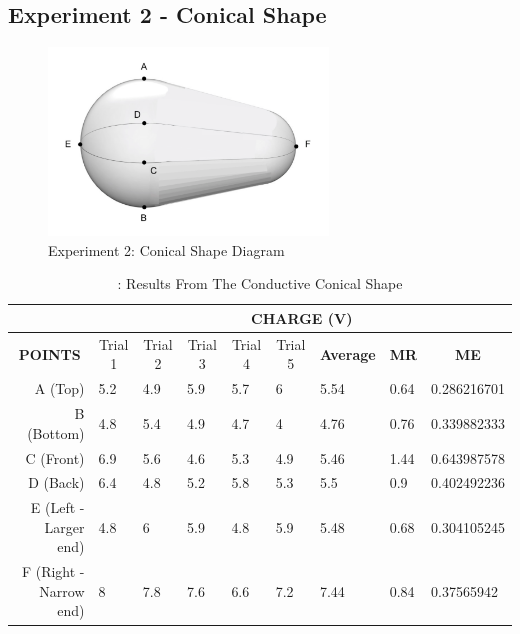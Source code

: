 \newpage

\subsection{Experiment 2 - Conical Shape}

\begin{figure}[h]
    \centering
    \includegraphics[height=5cm]{photos/experiment2image.png} %
    \caption{Experiment 2: Conical Shape Diagram}
    \label{fig:experiment2}
\end{figure}

\begin{table}[h]
    \caption{\label{tab:table5}: Results From The Conductive Conical Shape}
    \begin{tabular}{@{}rllllllll@{}}
    \toprule
    \multicolumn{1}{l}{}   & \multicolumn{8}{c}{\textbf{CHARGE (V)}}                 \\ \midrule
    \multicolumn{1}{c}{\textbf{POINTS}} &
      \multicolumn{1}{c}{Trial 1} &
      \multicolumn{1}{c}{Trial 2} &
      \multicolumn{1}{c}{Trial 3} &
      \multicolumn{1}{c}{Trial 4} &
      \multicolumn{1}{c}{Trial 5} &
      \multicolumn{1}{c}{\textbf{Average}} &
      \multicolumn{1}{c}{\textbf{MR}} &
      \multicolumn{1}{c}{\textbf{ME}} \\
    A (Top)                & 5.2 & 4.9 & 5.9 & 5.7 & 6   & 5.54 & 0.64 & 0.286216701 \\
    B (Bottom)             & 4.8 & 5.4 & 4.9 & 4.7 & 4   & 4.76 & 0.76 & 0.339882333 \\
    C (Front)              & 6.9 & 5.6 & 4.6 & 5.3 & 4.9 & 5.46 & 1.44 & 0.643987578 \\
    D (Back)               & 6.4 & 4.8 & 5.2 & 5.8 & 5.3 & 5.5  & 0.9  & 0.402492236 \\
    E (Left -Larger end)  & 4.8 & 6   & 5.9 & 4.8 & 5.9 & 5.48 & 0.68 & 0.304105245 \\
    F (Right - Narrow end) & 8   & 7.8 & 7.6 & 6.6 & 7.2 & 7.44 & 0.84 & 0.37565942 \\ \bottomrule
    \end{tabular}
\end{table}
    
